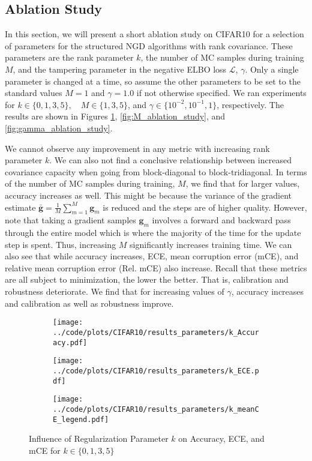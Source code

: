 \documentclass[a4paper, 11pt, oneside]{scrartcl}
\theoremstyle{break}
\newcommand{\matr}[1]{\boldsymbol{#1}}
\numberwithin{equation}{section}
\begin{document}
		\subsection{Ablation Study}
			In this section, we will present a short ablation study on CIFAR10 for a selection of parameters for the structured NGD algorithms with rank covariance.
			These parameters are the rank parameter $k$, the number of MC samples during training $M$, and the tampering parameter in the negative ELBO loss $\mathcal{L}$, $\gamma$. 
			Only a single parameter is changed at a time, so assume the other parameters to be set to the standard values $M = 1$ and $\gamma = 1.0$ if not otherwise specified. 
			We ran experiments for $k \in \{0, 1, 3, 5\}, \quad M \in \{1, 3, 5\}$, and $\gamma \in \{10^{-2}, 10^{-1}, 1\}$, respectively. 
			The results are shown in Figures \ref{fig:k_ablation_study}, \ref{fig:M_ablation_study}, and \ref{fig:gamma_ablation_study}.

			We cannot observe any improvement in any metric with increasing rank parameter $k$. 
			We can also not find a conclusive relationship between increased covariance capacity when going from block-diagonal to block-tridiagonal.
			In terms of the number of MC samples during training, $M$, we find that for larger values, accuracy increases as well. 
			This might be because the variance of the gradient estimate $\matr{\bar{g}} = \frac{1}{M} \sum_{m=1}^M \matr{g}_m$ is reduced and the steps are of higher quality. 
			However, note that taking a gradient samples $\matr{g}_m$ involves a forward and backward pass through the entire model which is where the majority of the time for the update step is spent. 
			Thus, increasing $M$ significantly increases training time. 
			We can also see that while accuracy increases, ECE, mean corruption error (mCE), and relative mean corruption error (Rel. mCE) also increase. 
			Recall that these metrics are all subject to minimization, the lower the better.
			That is, calibration and robustness deteriorate.
			We find that for increasing values of $\gamma$, accuracy increases and calibration as well as robustness improve. 

			\begin{figure}[H]
				\centering
				\begin{subfigure}{.3\textwidth}
					\centering
					\texttt{[image: ../code/plots/CIFAR10/results\_parameters/k\_Accuracy.pdf]}
				\end{subfigure}%
				\begin{subfigure}{.3\textwidth}
					\centering
					\texttt{[image: ../code/plots/CIFAR10/results\_parameters/k\_ECE.pdf]}
				\end{subfigure}%
				\begin{subfigure}{.3\textwidth}
					\centering
					\texttt{[image: ../code/plots/CIFAR10/results\_parameters/k\_meanCE\_legend.pdf]}
				\end{subfigure}
				\caption{Influence of Regularization Parameter $k$ on Accuracy, ECE, and mCE for $k \in \{0, 1, 3, 5\}$}
				\label{fig:k_ablation_study}
			\end{figure}
\end{document}
